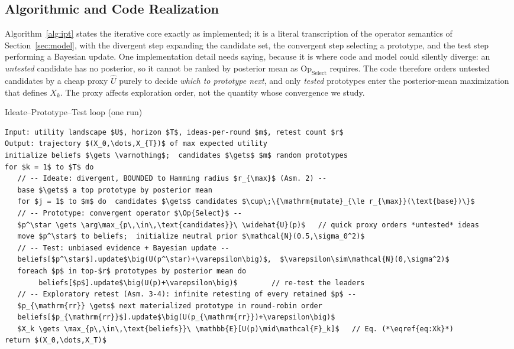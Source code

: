 \documentclass[11pt]{article}
\newcommand{\Op}[1]{\mathrm{Op}_{\mathrm{#1}}}
\begin{document}
\subsection{Algorithmic and Code Realization}
\label{sec:code}


Algorithm~\ref{alg:ipt} states the iterative core exactly as implemented; it is a literal transcription of the operator semantics of Section~\ref{sec:model}, with the divergent step expanding the candidate set, the convergent step selecting a prototype, and the test step performing a Bayesian update. One implementation detail needs saying, because it is where code and model could silently diverge: an \emph{untested} candidate has no posterior, so it cannot be ranked by posterior mean as $\Op{Select}$ requires. The code therefore orders untested candidates by a cheap proxy $\widehat U$ purely to decide \emph{which to prototype next}, and only \emph{tested} prototypes enter the posterior-mean maximization that defines $X_k$. The proxy affects exploration order, not the quantity whose convergence we study.

\begin{algorithm}
\caption{Ideate--Prototype--Test loop (one run)}
\label{alg:ipt}
\begin{lstlisting}[style=pseudo]
Input: utility landscape $U$, horizon $T$, ideas-per-round $m$, retest count $r$
Output: trajectory $(X_0,\dots,X_{T})$ of max expected utility
initialize beliefs $\gets \varnothing$;  candidates $\gets$ $m$ random prototypes
for $k = 1$ to $T$ do
   // -- Ideate: divergent, BOUNDED to Hamming radius $r_{\max}$ (Asm. 2) --
   base $\gets$ a top prototype by posterior mean
   for $j = 1$ to $m$ do  candidates $\gets$ candidates $\cup\;\{\mathrm{mutate}_{\le r_{\max}}(\text{base})\}$
   // -- Prototype: convergent operator $\Op{Select}$ --
   $p^\star \gets \arg\max_{p\,\in\,\text{candidates}}\ \widehat{U}(p)$   // quick proxy orders *untested* ideas
   move $p^\star$ to beliefs;  initialize neutral prior $\mathcal{N}(0.5,\sigma_0^2)$
   // -- Test: unbiased evidence + Bayesian update --
   beliefs[$p^\star$].update$\big(U(p^\star)+\varepsilon\big)$,  $\varepsilon\sim\mathcal{N}(0,\sigma^2)$
   foreach $p$ in top-$r$ prototypes by posterior mean do
        beliefs[$p$].update$\big(U(p)+\varepsilon\big)$        // re-test the leaders
   // -- Exploratory retest (Asm. 3-4): infinite retesting of every retained $p$ --
   $p_{\mathrm{rr}} \gets$ next materialized prototype in round-robin order
   beliefs[$p_{\mathrm{rr}}$].update$\big(U(p_{\mathrm{rr}})+\varepsilon\big)$
   $X_k \gets \max_{p\,\in\,\text{beliefs}}\ \mathbb{E}[U(p)\mid\mathcal{F}_k]$   // Eq. (*\eqref{eq:Xk}*)
return $(X_0,\dots,X_T)$
\end{lstlisting}
\end{algorithm}
\end{document}
